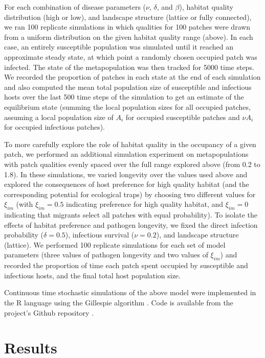 \documentclass{article}
\begin{document}
For each combination of disease parameters ($\nu$, $\delta$, and $\beta$), habitat quality distribution (high or low), and landscape structure (lattice or fully connected), we ran 100 replicate simulations in which qualities for 100 patches were drawn from a uniform distribution on the given habitat quality range (above). In each case, an entirely susceptible population was simulated until it reached an approximate steady state, at which point a randomly chosen occupied patch was infected.  The state of the metapopulation was then tracked for 5000 time steps.  We recorded the proportion of patches in each state at the end of each simulation and also computed the mean total population size of susceptible and infectious hosts over the last 500 time steps of the simulation to get an estimate of the equilibrium state (summing the local population sizes for all occupied patches, assuming a local population size of $A_i$ for occupied susceptible patches and $\nu A_i$ for occupied infectious patches).    

To more carefully explore the role of habitat quality in the occupancy of a given patch, we performed an additional simulation experiment on metapopulations with patch qualities evenly spaced over the full range explored above (from 0.2 to 1.8).
In these simulations, we varied longevity over the values used above and explored the consequences of host preference for high quality habitat (and the corresponding potential for ecological traps) by choosing two different values for $\xi_{im}$ (with $\xi_{im} = 0.5$ indicating preference for high quality habitat, and  $\xi_{im} = 0$ indicating that migrants select all patches with equal probability).  
To isolate the effects of habitat preference and pathogen longevity, we fixed the direct infection probability ($\delta = 0.5$), infectious survival ($\nu = 0.2$), and landscape structure (lattice).
We performed 100 replicate simulations for each set of model parameters (three values of pathogen longevity and two values of $\xi_{im}$) and recorded the proportion of time each patch spent occupied by susceptible and infectious hosts, and the final total host population size.

Continuous time stochastic simulations of the above model were implemented in the R language \cite{R2014} using the Gillespie algorithm \cite{Gillespie1977}.  Code is available from the project's Github repository \cite{Leach2016}.

\section{Results}
\label{results}
\end{document}
